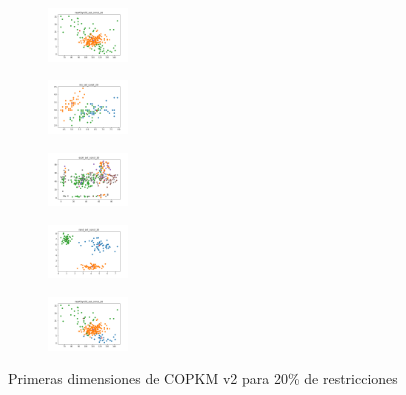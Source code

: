 \begin{figure}[H]
\begin{subfigure}
        \centering
        \includegraphics[width=0.234\textwidth]{img/am01mej/newthyroid_set_const_20_49258669_clust.png}
    \end{subfigure}
    \hfill
    \begin{subfigure}
        \centering
        \includegraphics[width=0.234\textwidth]{img/am01mej/iris_set_const_20_3773969821_clust.png}
    \end{subfigure}
    \hfill
    \begin{subfigure}
        \centering
        \includegraphics[width=0.234\textwidth]{img/am01mej/ecoli_set_const_20_3773969821_clust.png}
    \end{subfigure}
    \hfill
    \begin{subfigure}
        \centering
        \includegraphics[width=0.234\textwidth]{img/am01mej/rand_set_const_20_3773969821_clust.png}
    \end{subfigure}
    \hfill
    \begin{subfigure}
        \centering
        \includegraphics[width=0.234\textwidth]{img/am01mej/newthyroid_set_const_20_3773969821_clust.png}
    \end{subfigure}
    \caption{Primeras dimensiones de COPKM v2 para 20\% de restricciones}
\end{figure}

\vspace*{\fill}
\newpage
\vspace*{\fill}
